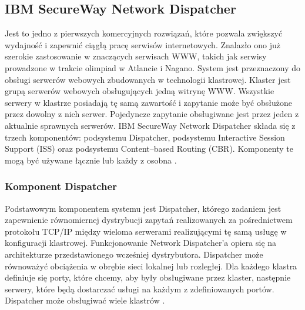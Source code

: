 \subsection{IBM SecureWay Network Dispatcher}
Jest to jedno z pierwszych komercyjnych rozwiązań, które pozwala zwiększyć wydajność i zapewnić ciągłą pracę serwisów 
internetowych. Znalazło ono już szerokie zastosowanie w znaczących serwisach WWW, takich jak serwisy prowadzone w trakcie 
olimpiad w Atlancie i Nagano. 
System jest przeznaczony do obsługi serwerów webowych zbudowanych w technologii klastrowej. Klaster jest grupą serwerów 
webowych obsługujących jedną witrynę WWW. Wszystkie serwery w klastrze posiadają tę samą zawartość i zapytanie może być 
obsłużone przez dowolny z nich serwer. Pojedyncze zapytanie obsługiwane jest przez jeden z aktualnie sprawnych serwerów. 
IBM SecureWay Network Dispatcher składa się z trzech komponentów: podsystemu Dispatcher, podsystemu Interactive Session 
Support (ISS) oraz podsystemu Content--based Routing (CBR). Komponenty te mogą być używane łącznie lub każdy z 
osobna \cite{LoadBalancingWithND}.

\subsubsection{Komponent Dispatcher}

Podstawowym komponentem systemu jest Dispatcher, którego zadaniem jest zapewnienie równomiernej dystrybucji zapytań 
realizowanych za pośrednictwem protokołu TCP/IP między wieloma serwerami realizującymi tę samą usługę w konfiguracji 
klastrowej. Funkcjonowanie Network Dispatcher'a opiera się na architekturze przedstawionego wcześniej dystrybutora. 
Dispatcher może równoważyć obciążenia w obrębie sieci lokalnej lub rozległej. Dla każdego klastra definiuje się porty, które 
chcemy, aby były obsługiwane przez klaster, następnie serwery, które będą dostarczać usługi na każdym z zdefiniowanych portów. 
Dispatcher może obsługiwać wiele klastrów \cite{NDUsersGuide}. 

